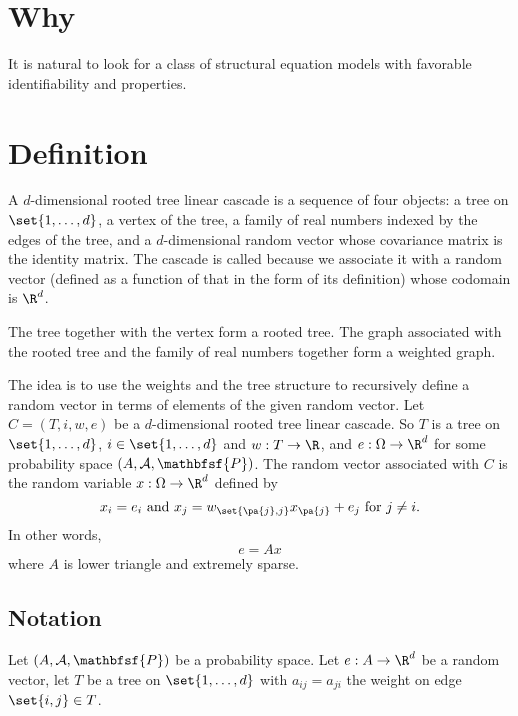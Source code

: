 
\section*{Why}

It is natural to look for a class of structural equation models with favorable identifiability and properties.

\section*{Definition}

A \t{$d$-dimensional rooted tree linear cascade} is a sequence of four objects: a tree on $\set{1, \dots , d}$, a vertex of the tree, a family of real numbers indexed by the edges of the tree, and a $d$-dimensional random vector whose covariance matrix is the identity matrix.
The cascade is called  because we associate it with a random vector (defined as a function of that in the form of its definition) whose codomain is $\R ^d$.

The tree together with the vertex form a rooted tree.
The graph associated with the rooted tree and the family of real numbers together form a weighted graph.

The idea is to use the weights and the tree structure to recursively define a random vector in terms of elements of the given random vector.
Let $C = (T, i, w, e)$ be a $d$-dimensional rooted tree linear cascade.
So $T$ is a tree on $\set{1, \dots , d}$, $i \in \set{1, \dots , d}$ and $w: T \to \R $, and $e: \Omega  \to \R ^d$ for some probability space $(A, \mathcal{A} , \mathbfsf{P} )$.
The random vector associated with $C$ is the random variable $x: \Omega  \to \R ^d$ defined by
  \[
x_i = e_i \text{ and } x_j = w_{\set{\pa{j}, j}}x_{\pa{j}} + e_{j} \text{ for } j \neq i.
  \]
In other words,
  \[
e = Ax
  \]
where $A$ is lower triangle and extremely sparse.

\subsection*{Notation}

Let $(A, \mathcal{A} , \mathbfsf{P} )$ be a probability space.
Let $e: A \to \R ^d$ be a random vector, let $T$ be a tree on $\set{1, \dots , d}$ with $a_{ij} = a_{ji}$ the weight on edge $\set{i, j} \in T$.
